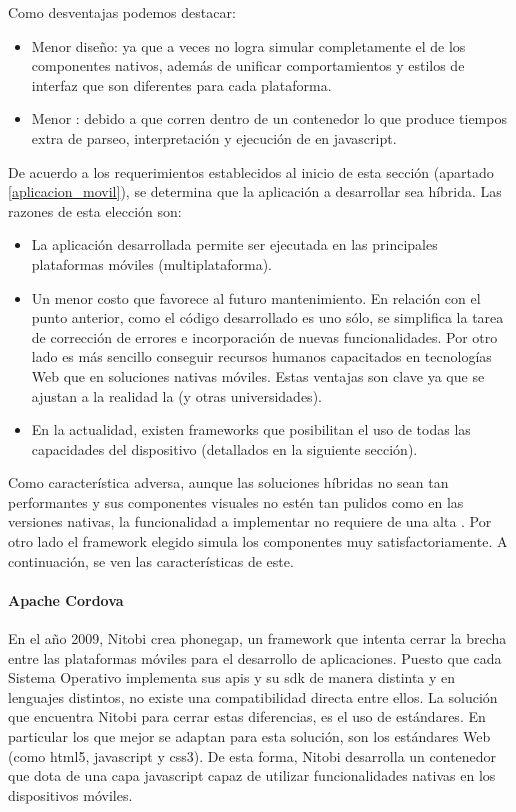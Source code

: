 Como desventajas podemos destacar:
\begin{itemize}
\item Menor diseño: ya que a veces no logra simular completamente el  de los componentes nativos, además de unificar comportamientos y estilos de interfaz que son diferentes para cada plataforma.
\item Menor : debido a que corren dentro de un contenedor lo que produce tiempos extra de parseo, interpretación y ejecución de  en \gls{javascript}.
\end{itemize}

De acuerdo a los requerimientos establecidos al inicio de esta sección (apartado \ref{aplicacion_movil}), se determina que la aplicación a desarrollar sea híbrida. Las razones de esta elección son: 
\begin{itemize}
\item La aplicación desarrollada permite ser ejecutada en las principales plataformas móviles (multiplataforma).
\item Un menor costo que favorece al futuro mantenimiento. En relación con el punto anterior, como el código desarrollado es uno sólo, se simplifica la tarea de corrección de errores e incorporación de nuevas funcionalidades. Por otro lado es más sencillo conseguir recursos humanos capacitados en tecnologías Web que en soluciones nativas móviles. Estas ventajas son clave ya que se ajustan a la realidad la \unlp (y otras universidades).
\item En la actualidad, existen \gls{framework}s que posibilitan el uso de todas las capacidades del dispositivo (detallados en la siguiente sección).
\end{itemize} 

Como característica adversa, aunque las soluciones híbridas no sean tan performantes y sus componentes visuales no estén tan pulidos como en las versiones nativas, la funcionalidad a implementar no requiere de una alta . Por otro lado el \gls{framework} elegido simula los componentes muy satisfactoriamente. A continuación, se ven las características de este.

\paragraph{Apache Cordova}
\label{cordova}

En el año 2009, Nitobi crea \gls{phonegap}, un \gls{framework} que intenta cerrar la brecha entre las plataformas móviles para el desarrollo de aplicaciones. Puesto que cada Sistema Operativo implementa sus \glspl{api} y su \gls{sdk} de manera distinta y en lenguajes distintos, no existe una compatibilidad directa entre ellos. La solución que encuentra Nitobi para cerrar estas diferencias, es el uso de estándares. En particular los que mejor se adaptan para esta solución, son los estándares Web (como \gls{html}5, \gls{javascript} y \gls{css}3). De esta forma, Nitobi desarrolla un contenedor que dota de una capa \gls{javascript} capaz de utilizar funcionalidades nativas en los dispositivos móviles.

